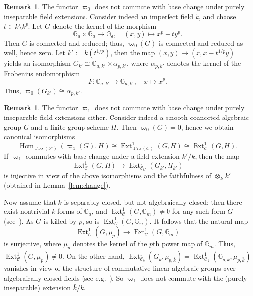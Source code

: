 \documentclass[11pt]{article}
\theoremstyle{definition}
\newtheorem{rema}[theo]{Remark}
\numberwithin{equation}{section}
\newcommand\bG{{\mathbb G}}
\newcommand\cC{{\mathcal C}}
\newcommand\cF{{\mathcal F}}
\DeclareMathOperator{\Ext}{Ext}
\DeclareMathOperator{\Hom}{Hom}
\DeclareMathOperator{\Pro}{Pro}
\theoremstyle{remark}
\begin{document}
\begin{rema}\label{3.19.1}
The functor $\varpi_0$ does not commute with base change under purely inseparable field extensions. Consider indeed an imperfect field $k$, and choose $t \in k \setminus k^p$. Let $G$ denote the kernel of the morphism
\[
\bG_a \times \bG_a \longrightarrow \bG_a,
\quad (x,y) \longmapsto x^p - t y^p.
\]
Then $G$ is connected and reduced; thus, $\varpi_0(G)$ is connected and reduced as well, hence zero. Let $k' := k(t^{1/p})$, then the map $(x,y) \mapsto (x, x - t^{1/p} y)$ yields an isomorphism $G_{k'} \cong \bG_{a,k'} \times \alpha_{p,k'}$, where $\alpha_{p,k'}$ denotes the kernel of the Frobenius endomorphism
\[
F : \bG_{a,k'} \longrightarrow \bG_{a,k'}, \quad x \longmapsto x^p.
\]
Thus, $\varpi_0(G_{k'}) \cong \alpha_{p,k'}$.
\end{rema}

\begin{rema}\label{3.19.2}
The functor $\varpi_1$ does not commute with base change under purely inseparable field extensions either. Consider indeed a smooth connected algebraic group $G$ and a finite group scheme $H$. Then $\varpi_0(G) = 0$, hence we obtain canonical isomorphisms
\[
\Hom_{\Pro(\cF)}(\varpi_1(G),H)
\cong \Ext^1_{\Pro(\cC)}(G,H)
\cong \Ext^1_{\cC}(G,H).
\]
If $\varpi_1$ commutes with base change under a field extension $k'/k$, then the map
\[
\Ext^1_{\cC}(G,H) \longrightarrow
\Ext^1_{\cC_{k'}}(G_{k'},H_{k'})
\]
is injective in view of the above isomorphisms and the faithfulness of $\otimes_k \, k'$ (obtained in Lemma~\ref{lem:change}).

Now assume that $k$ is separably closed, but not algebraically closed; then there exist nontrivial $k$-forms of $\bG_a$, and $\Ext^1_{\cC}(G,\bG_m) \neq 0$ for any such form $G$ (see~\cite[Lem.~9.4]{Totaro}). As $G$ is killed by $p$, so is $\Ext^1_{\cC}(G,\bG_m)$. It follows that the natural map
\[
\Ext^1_{\cC}(G,\mu_p) \longrightarrow
\Ext^1_{\cC}(G,\bG_m)
\]
is surjective, where $\mu_p$ denotes the kernel of the $p$th power map of $\bG_m$. Thus, $\Ext^1_{\cC}(G,\mu_p) \neq 0$. On the other hand, $\Ext^1_{\cC_{\bar{k}}}(G_{\bar{k}}, \mu_{p,\bar{k}}) = \Ext^1_{\cC_{\bar{k}}}(\bG_{a,\bar{k}}, \mu_{p,\bar{k}})$ vanishes in view of the structure of commutative linear algebraic groups over algebraically closed fields (see e.g.~\cite[IV.3.1.1]{DG}). So $\varpi_1$ does not commute with the (purely inseparable) extension $\bar{k}/k$.
\end{rema}
\end{document}
